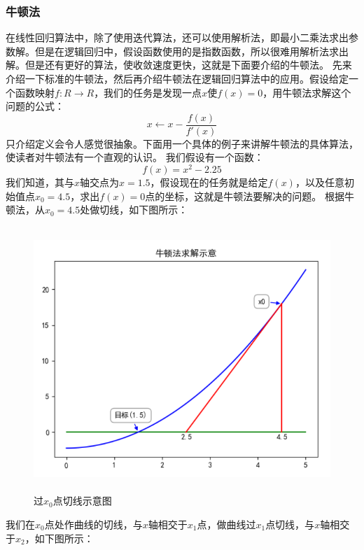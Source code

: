 \documentclass[UTF8]{article}
\begin{document}
\subsubsection{牛顿法}
在线性回归算法中，除了使用迭代算法，还可以使用解析法，即最小二乘法求出参数解。但是在逻辑回归中，假设函数使用的是指数函数，所以很难用解析法求出解。但是还有更好的算法，使收敛速度更快，这就是下面要介绍的牛顿法。\newline
先来介绍一下标准的牛顿法，然后再介绍牛顿法在逻辑回归算法中的应用。假设给定一个函数映射$f:R \to R$，我们的任务是发现一点$x$使$f(x)=0$，用牛顿法求解这个问题的公式：
\begin{equation}
x \leftarrow x - \frac{f(x)}{f'(x)}
\label{lcrn-newton-method}
\end{equation}
只介绍定义会令人感觉很抽象。下面用一个具体的例子来讲解牛顿法的具体算法，使读者对牛顿法有一个直观的认识。\newline
我们假设有一个函数：
\begin{equation}
f(x)=x^{2} - 2.25
\label{lcrn-newton-method-demo-function}
\end{equation}
我们知道，其与$x$轴交点为$x=1.5$，假设现在的任务就是给定$f(x)$，以及任意初始值点$x_{0}=4.5$，求出$f(x)=0$点的坐标，这就是牛顿法要解决的问题。\newline
根据牛顿法，从$x_{0}=4.5$处做切线，如下图所示：
\begin{figure}[H]
	\caption{过$x_{0}$点切线示意图}
	\label{f000024}
	\centering
	\includegraphics[height=10cm]{images/f000024}
\end{figure}
我们在$x_{0}$点处作曲线的切线，与$x$轴相交于$x_{1}$点，做曲线过$x_{1}$点切线，与$x$轴相交于$x_{2}$，如下图所示：
\end{document}
